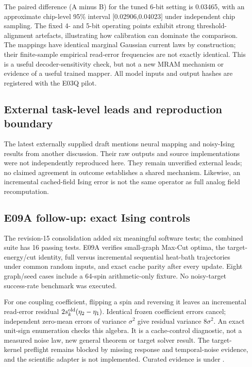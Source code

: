 The paired difference (A minus B) for the tuned 6-bit setting is 0.03465,
with an approximate chip-level 95\% interval [0.02906,0.04023] under independent
chip sampling. The fixed 4- and 5-bit operating points exhibit strong
threshold-alignment artefacts, illustrating how calibration can dominate the
comparison. The mappings have identical marginal Gaussian current laws by
construction; their finite-sample empirical read-error frequencies are not exactly
identical. This is a useful decoder-sensitivity check, but not a new MRAM mechanism
or evidence of a useful trained mapper. All model inputs and output hashes are
registered with the E03Q pilot.

\subsection{External task-level leads and reproduction boundary}

The latest externally supplied draft mentions neural mapping and noisy-Ising
results from another discussion. Their raw outputs and source implementations were
not independently reproduced here. They remain unverified external leads; no
claimed agreement in outcome establishes a shared mechanism. Likewise, an
incremental cached-field Ising error is not the same operator as full analog
field recomputation.

\subsection{E09A follow-up: exact Ising controls}

The revision-15 consolidation added six meaningful software tests; the combined suite
has 16 passing tests. E09A verifies small-graph Max-Cut optima, the target-energy/cut
identity, full versus incremental sequential heat-bath trajectories under common random
inputs, and exact cache parity after every update. Eight graph/seed cases include a
64-spin arithmetic-only fixture. No noisy-target success-rate benchmark was executed.

For one coupling coefficient, flipping a spin and reversing it leaves an incremental
read-error residual $2s_k^{\rm old}(\eta_2-\eta_1)$. Identical frozen coefficient errors
cancel; independent zero-mean errors of variance $\sigma^2$ give residual variance
$8\sigma^2$. An exact unit-sign enumeration checks this algebra. It is a cache-control
diagnostic, not a measured noise law, new general theorem or target solver result.
The target-kernel preflight remains blocked by missing response and temporal-noise
evidence, and the scientific adapter is not implemented. Curated evidence is under
.

